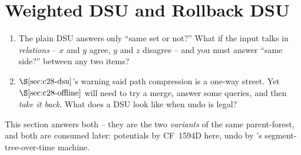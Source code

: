 \section{Weighted DSU and Rollback DSU}\label{sec:c28-weighted}

\begin{previouslybox}
\begin{enumerate}[nosep, leftmargin=1.6em]
  \item The plain DSU answers only ``same set or not?''  What if the input
        talks in \emph{relations} -- \(x\) and \(y\) agree, \(y\) and \(z\)
        disagree -- and you must answer ``same side?'' between any two items?
  \item \(\secref{c28-dsu}\)'s warning said path compression is a one-way
        street.  Yet \(\secref{c28-offline}\) will need to try a merge,
        answer some queries, and then \emph{take it back}.  What does a DSU
        look like when undo is legal?
\end{enumerate}
This section answers both -- they are the two \emph{variants} of the same
parent-forest, and both are consumed later: potentials by CF~1594D here,
undo by 's segment-tree-over-time machine.
\end{previouslybox}

